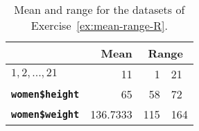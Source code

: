 \begin{table}
  \centering
  \begin{tabular}{@{}l|r|rl@{}}
    \toprule
      & \textbf{Mean} & \multicolumn{2}{c}{\textbf{Range}} \\
    \midrule                
                  \textbf{$1,2,...,21$} & 11       & 1    & 21    \\ 
        \textbf{\texttt{women\$height}} & 65       & 58   & 72    \\
        \textbf{\texttt{women\$weight}} & 136.7333 & 115  & 164   \\
    \bottomrule
  \end{tabular}
  \caption{Mean and range for the datasets of Exercise~\ref{ex:mean-range-R}.}
  \label{tab:opl-mean-range-R}
\end{table}